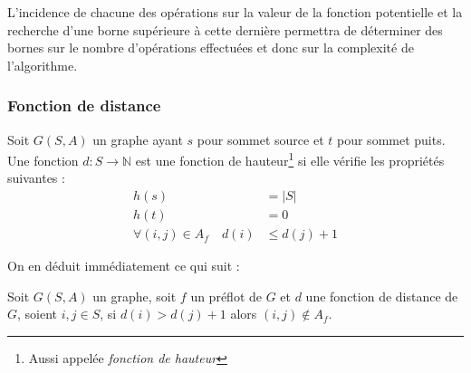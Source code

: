 L'incidence de chacune des opérations sur la valeur de la fonction potentielle et la recherche d'une
borne supérieure à cette dernière permettra de déterminer des bornes sur le nombre d'opérations
effectuées et donc sur la complexité de l'algorithme.

\subsubsection{Fonction de distance}

Soit $G(S, A)$ un graphe ayant $s$ pour sommet source et $t$ pour sommet puits. Une fonction $d: S
\rightarrow \mathbb{N}$ est une fonction de hauteur\footnote{Aussi appelée \emph{fonction de
	hauteur}} si elle vérifie les propriétés suivantes :
\begin{subequations}
	\label{eq:prop_haut}
	\begin{align}
		h(s) &= |S| \label{eq:ph1} \\
		h(t) &= 0   \label{eq:ph2} \\
		\forall (i,j) \in A_f \quad d(i) &\leq d(j) + 1 \label{eq:ph3} 
	\end{align}
\end{subequations}

On en déduit immédiatement ce qui suit :
\begin{lemma}
	\label{ingr}
	Soit $G(S,A)$ un graphe, soit $f$ un préflot de $G$ et $d$ une fonction de distance de $G$, soient
	$i,j \in S$, si $d(i) > d(j) + 1$ alors $(i,j) \not \in A_f$.
\end{lemma}
